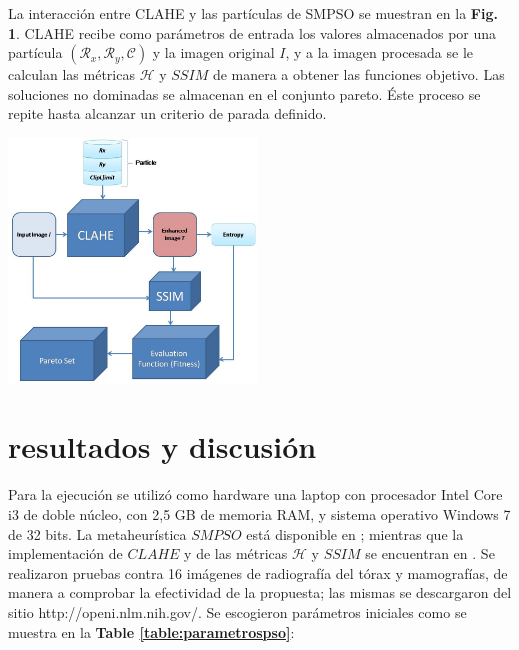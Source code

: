 \documentclass[spanish,twocolumn]{article}
\begin{document}
{La interacción entre CLAHE y las partículas de SMPSO se muestran en la \textbf {Fig. 1}. CLAHE recibe como parámetros de entrada los valores almacenados por una partícula $(\mathcal{R}_x,\mathcal{R}_y, \mathscr{C})$ y la imagen original $I$, y a la imagen procesada se le calculan las métricas $\mathscr{H}$ y $SSIM$ de manera a obtener las funciones objetivo. Las soluciones no dominadas se almacenan en el conjunto pareto. Éste proceso se repite hasta alcanzar un criterio de parada definido.

\begin{minipage}[b]{1.0\linewidth}
  \vspace{0.5cm}
  \centering
  \centerline{\includegraphics[height=6.5cm]{Figures/particula_clahe2}}
  \vspace{0.5cm}
  \label{fig:particula_clahe}
\end{minipage}

\section{resultados y discusión}
\label{sec:resultadosdiscusion}


Para la ejecución se utilizó como hardware una laptop con procesador Intel Core i3 de doble núcleo, con 2,5 GB de memoria RAM, y sistema operativo Windows 7 de 32 bits. La metaheurística $SMPSO$ está disponible en \cite{5586354}; mientras que la implementación de $CLAHE$ y de las métricas $\mathscr{H}$ y $SSIM$ se encuentran en \cite{opencv_library}. Se realizaron pruebas contra {\color{red} 16} imágenes de radiografía del tórax y mamografías, de manera a comprobar la efectividad de la propuesta; las mismas se descargaron del sitio http://openi.nlm.nih.gov/.  Se escogieron parámetros iniciales como se muestra en la \textbf{Table \ref{table:parametrospso}}:

}
\end{document}
